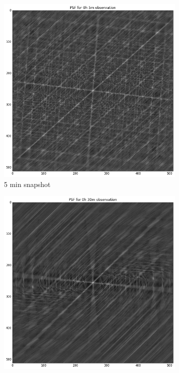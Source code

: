 \begin{figure}[h]
 \begin{mdframed}
 \centering
 \begin{subfigure}[b]{0.24\textwidth}
  \includegraphics[width=\textwidth]{images/evla_observation_psf/5min.png}
  \caption{5 min snapshot}
 \end{subfigure}
 \begin{subfigure}[b]{0.24\textwidth}
  \includegraphics[width=\textwidth]{images/evla_observation_psf/30min.png}

\end{subfigure}
\end{mdframed}
\end{figure}
